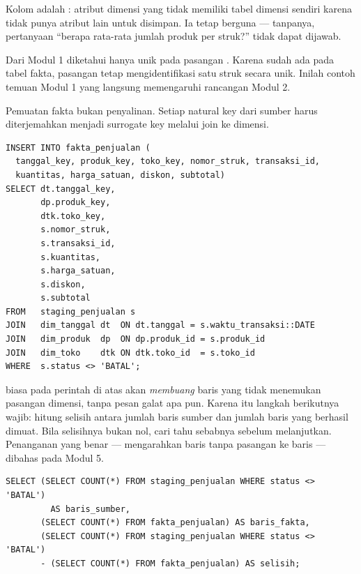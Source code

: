 Kolom  adalah : atribut
dimensi yang tidak memiliki tabel dimensi sendiri karena tidak punya atribut
lain untuk disimpan. Ia tetap berguna --- tanpanya, pertanyaan ``berapa
rata-rata jumlah produk per struk?'' tidak dapat dijawab.

\begin{catatan}
Dari Modul 1 diketahui  hanya unik pada pasangan
. Karena  sudah ada pada
tabel fakta, pasangan  tetap
mengidentifikasi satu struk secara unik. Inilah contoh temuan Modul 1 yang
langsung memengaruhi rancangan Modul 2.
\end{catatan}


Pemuatan fakta bukan penyalinan. Setiap natural key dari sumber harus
diterjemahkan menjadi surrogate key melalui join ke dimensi.

\begin{lstlisting}[style=sqlgaya]
INSERT INTO fakta_penjualan (
  tanggal_key, produk_key, toko_key, nomor_struk, transaksi_id,
  kuantitas, harga_satuan, diskon, subtotal)
SELECT dt.tanggal_key,
       dp.produk_key,
       dtk.toko_key,
       s.nomor_struk,
       s.transaksi_id,
       s.kuantitas,
       s.harga_satuan,
       s.diskon,
       s.subtotal
FROM   staging_penjualan s
JOIN   dim_tanggal dt  ON dt.tanggal = s.waktu_transaksi::DATE
JOIN   dim_produk  dp  ON dp.produk_id = s.produk_id
JOIN   dim_toko    dtk ON dtk.toko_id  = s.toko_id
WHERE  s.status <> 'BATAL';
\end{lstlisting}

\begin{peringatan}
 biasa pada perintah di atas akan \emph{membuang} baris yang
tidak menemukan pasangan dimensi, tanpa pesan galat apa pun. Karena itu
langkah berikutnya wajib: hitung selisih antara jumlah baris sumber dan jumlah
baris yang berhasil dimuat. Bila selisihnya bukan nol, cari tahu sebabnya
sebelum melanjutkan. Penanganan yang benar --- mengarahkan baris tanpa pasangan
ke baris  --- dibahas pada Modul 5.
\end{peringatan}


\begin{lstlisting}[style=sqlgaya]
SELECT (SELECT COUNT(*) FROM staging_penjualan WHERE status <> 'BATAL')
         AS baris_sumber,
       (SELECT COUNT(*) FROM fakta_penjualan) AS baris_fakta,
       (SELECT COUNT(*) FROM staging_penjualan WHERE status <> 'BATAL')
       - (SELECT COUNT(*) FROM fakta_penjualan) AS selisih;
\end{lstlisting}

